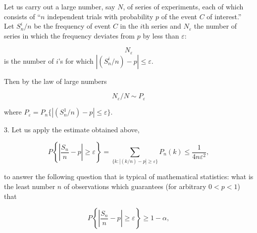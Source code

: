 Let us carry out a large number, say $N$, of series of experiments, each of which consists of “$n$ independent trials with probability $p$ of the event $C$ of interest.” Let $S_n^i/n$ be the frequency of event $C$ in the $i$th series and $N_\varepsilon$ the number of series in which the frequency deviates from $p$ by less than $\varepsilon$:

$$N_\varepsilon$$ is the number of $i$’s for which $|(S_n^i/n) - p| \leq \varepsilon$.

Then by the law of large numbers

$$N_\varepsilon/N \sim P_\varepsilon$$

where $P_\varepsilon = P_n\{|(S_n^1/n) - p| \leq \varepsilon\}$.

3. Let us apply the estimate obtained above,

$$P\left\{\left|\frac{S_n}{n} - p\right| \geq \varepsilon\right\} = \sum_{\{k: |(k/n)-p| \geq \varepsilon\}} P_n(k) \leq \frac{1}{4n\varepsilon^2},$$

to answer the following question that is typical of mathematical statistics: what is the least number $n$ of observations which guarantees (for arbitrary $0 < p < 1$) that

$$P\left\{\left|\frac{S_n}{n} - p\right| \geq \varepsilon\right\} \geq 1 - \alpha,$$
